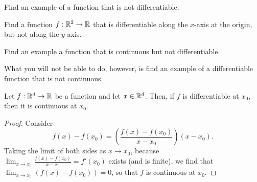 \begin{exr}
Find an example of a function that is not differentiable.
\end{exr}
\begin{exr}
Find a function $f:\mathbb{R} ^2\rightarrow \mathbb{R}$ that is differentiable along the $x$-axis at the origin, but not along the $y$-axis.
\end{exr}
\begin{exr}
Find an example a function that is continuous but not differentiable.
\end{exr}
What you will not be able to do, however, is find an example of a differentiable function that is not continuous.
\begin{prp}
Let $f:\mathbb{R} ^d\rightarrow \mathbb{R}$ be a function and let $x\in \mathbb{R} ^d$.  Then, if $f$ is differentiable at $x_0$, then it is continuous at $x_0$.
\begin{proof}
Consider
\begin{equation}
f(x)-f(x_0)=\left( \frac{f(x)-f(x_0)}{x-x_0}\right) (x-x_0).
\end{equation}
Taking the limit of both sides as $x\to x_0$, because $\lim _{x\to x_0}\frac{f(x)-f(x_0)}{x-x_0}=f'(x_0)$ exists (and is finite), we find that $\lim _{x\to x_0}(f(x)-f(x_0))=0$, so that $f$ is continuous at $x_0$.
\end{proof}
\end{prp}


